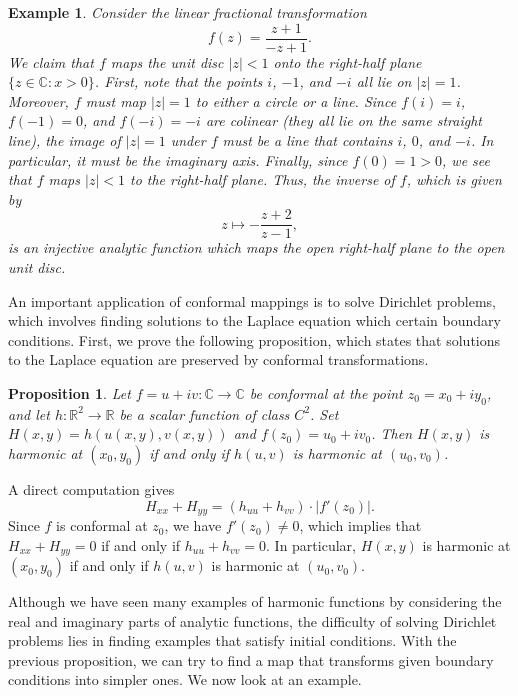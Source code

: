 \documentclass[10pt]{article}
\makeatletter
\newcommand{\R}{\mathbb{R}}
\newcommand{\C}{\mathbb{C}}
\theoremstyle{newstyle}
\newtheorem{prop}[thm]{Proposition}
\newtheorem{exmp}[thm]{Example}
\newenvironment{pf}[1][\proofname]{\par
  \pushQED{\qed}%
  \normalfont \topsep0\p@\relax
  \trivlist
  \item[\hskip\labelsep\scshape
  #1\@addpunct{.}]\ignorespaces
}{%
  \popQED\endtrivlist\@endpefalse
}
\makeatother
\begin{document}
\begin{exmp}
Consider the linear fractional transformation 
\[ f(z) = \frac{z+1}{-z+1}. \]
We claim that $f$ maps the unit disc $|z| < 1$ onto the right-half plane $\{z \in \C : x > 0\}$. 
First, note that the points $i$, $-1$, and $-i$ all lie on $|z| = 1$. Moreover, $f$ must 
map $|z| = 1$ to either a circle or a line. Since $f(i) = i$, $f(-1) = 0$, and $f(-i) = -i$ 
are colinear (they all lie on the same straight line), the image of $|z| = 1$ under $f$ 
must be a line that contains $i$, $0$, and $-i$. In particular, it must be the imaginary axis. 
Finally, since $f(0) = 1 > 0$, we see that $f$ maps $|z| < 1$ to the right-half plane. 
Thus, the inverse of $f$, which is given by 
\[ z \mapsto - \frac{z+2}{z-1}, \]
is an injective analytic function which maps the open right-half plane to the open unit disc. 
\end{exmp}

An important application of conformal mappings is to solve Dirichlet problems, which involves 
finding solutions to the Laplace equation which certain boundary conditions. First, we prove the 
following proposition, which states that solutions to the Laplace equation are preserved by 
conformal transformations. 

\begin{prop}
Let $f = u+iv : \C \to \C$ be conformal at the point $z_0 = x_0 + iy_0$, and let $h : \R^2 \to \R$ 
be a scalar function of class $C^2$. Set $H(x, y) = h(u(x, y), v(x, y))$ and $f(z_0) = u_0 + iv_0$. 
Then $H(x, y)$ is harmonic at $(x_0, y_0)$ if and only if $h(u, v)$ is harmonic at $(u_0, v_0)$. 
\end{prop}
\begin{pf}
A direct computation gives 
\[ H_{xx} + H_{yy} = (h_{uu} + h_{vv}) \cdot |f'(z_0)|. \]
Since $f$ is conformal at $z_0$, we have $f'(z_0) \neq 0$, which implies that 
$H_{xx} + H_{yy} = 0$ if and only if $h_{uu} + h_{vv} = 0$. In particular, 
$H(x, y)$ is harmonic at $(x_0, y_0)$ if and only if $h(u, v)$ is harmonic at $(u_0, v_0)$. 
\end{pf}

Although we have seen many examples of harmonic functions by considering the real and imaginary 
parts of analytic functions, the difficulty of solving Dirichlet problems lies in finding examples 
that satisfy initial conditions. With the previous proposition, we can try to find a map that 
transforms given boundary conditions into simpler ones. We now look at an example. 
\end{document}

